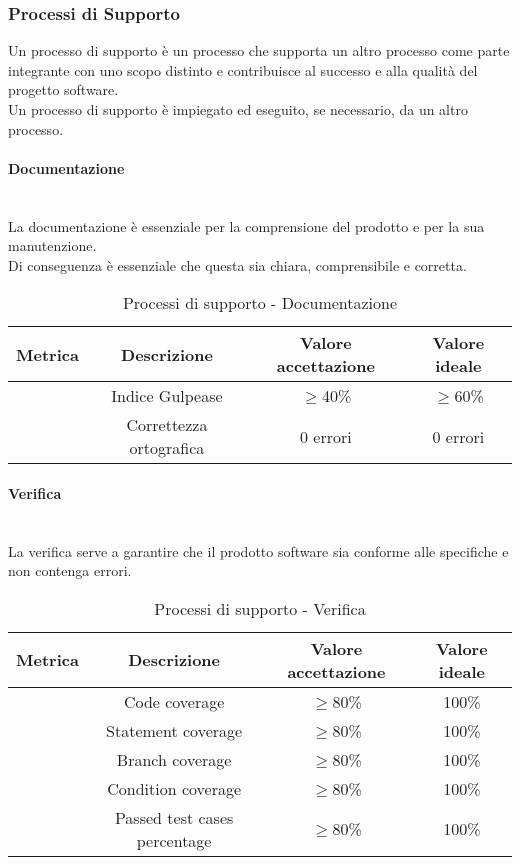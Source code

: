 \documentclass[11pt]{article}
\begin{document}
\begin{justify}
\subsubsection{Processi di Supporto}
Un processo di supporto è un processo che supporta un altro processo come parte integrante con uno scopo distinto e contribuisce al successo e alla qualità del progetto software.\\
Un processo di supporto è impiegato ed eseguito, se necessario, da un altro processo.\\
\paragraph{Documentazione}\mbox{}\\
La documentazione è essenziale per la comprensione del prodotto e per la sua manutenzione.\\
Di conseguenza è essenziale che questa sia chiara, comprensibile e corretta.\\
\begin{table}[H]
  \centering
\begin{tabular}{|c|c|c|c|}
  \hline
  \textbf{Metrica} & \textbf{Descrizione} & \textbf{Valore accettazione} & \textbf{Valore ideale}\\
  \hline
  & Indice Gulpease & $\geq$40\% & $\geq$60\% \\
  \hline
  & Correttezza ortografica & 0 errori & 0 errori \\
  \hline
\end{tabular}
\caption{Processi di supporto - Documentazione}
\label{tab:documentazione}
\end{table}

\paragraph{Verifica}\mbox{}\\
La verifica serve a garantire che il prodotto software sia conforme alle specifiche e non contenga errori.\\
\begin{table}[H]
  \centering
\begin{tabular}{|c|c|c|c|}
  \hline
  \textbf{Metrica} & \textbf{Descrizione} & \textbf{Valore accettazione} & \textbf{Valore ideale}\\
  \hline
  & Code coverage & $\geq$80\% & 100\% \\
  \hline
  & Statement coverage & $\geq$80\% & 100\% \\
  \hline
  & Branch coverage & $\geq$80\% & 100\% \\
  \hline
  & Condition coverage & $\geq$80\% & 100\% \\
  \hline
  & Passed test cases percentage & $\geq$80\% & 100\% \\
  \hline
\end{tabular}
\caption{Processi di supporto - Verifica}
\label{tab:verifica}
\end{table}


\end{justify}
\end{document}
